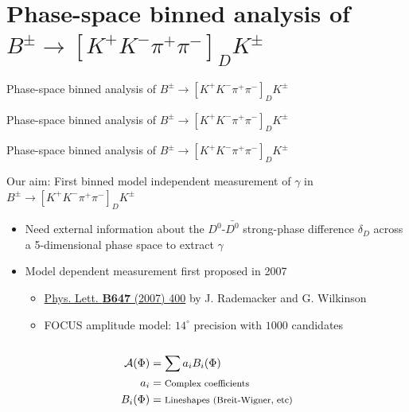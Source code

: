\documentclass{beamer}
\begin{document}
\section{Phase-space binned analysis of \texorpdfstring{$B^\pm\to[K^+K^-\pi^+\pi^-]_DK^\pm$}{B2DKD2KKpipi}}
\begin{frame}{Phase-space binned analysis of $B^\pm\to[K^+K^-\pi^+\pi^-]_DK^\pm$}
  \begin{center}
    {\huge Phase-space binned analysis of $B^\pm\to[K^+K^-\pi^+\pi^-]_DK^\pm$}
  \end{center}
\end{frame}

\begin{frame}{Phase-space binned analysis of $B^\pm\to[K^+K^-\pi^+\pi^-]_DK^\pm$}
  \begin{center}
    \Large Our aim: First binned model independent measurement of $\gamma$ in $B^\pm\to[K^+K^-\pi^+\pi^-]_DK^\pm$
  \end{center}
  \begin{itemize}
    \setlength\itemsep{1.0em}
    \item{Need external information about the $D^0$-$\bar{D^0}$ strong-phase difference $\delta_D$ across a 5-dimensional phase space to extract $\gamma$}
    \item{Model dependent measurement first proposed in 2007}
    \begin{itemize}
      \item{\href{https://www.sciencedirect.com/science/article/pii/S0370269307002262}{Phys. Lett. \textbf{B647} (2007) 400} by J. Rademacker and G. Wilkinson}
      \item{FOCUS amplitude model: $14^\circ$ precision with $1000$ candidates}
    \end{itemize}
  \end{itemize}
  \vspace{-0.35cm}
  \begin{columns}[onlytextwidth]
    \begin{column}{0.6\textwidth}
      \centering
      \begin{align*}
        \mathcal{A}(\Phi) &= \sum a_iB_i(\Phi) \\
        a_i &= \textrm{\footnotesize Complex coefficients} \\
        B_i(\Phi) &= \textrm{\footnotesize Lineshapes (Breit-Wigner, etc)} \\
      \end{align*}
    \end{column}

\end{columns}
\end{frame}
\end{document}
